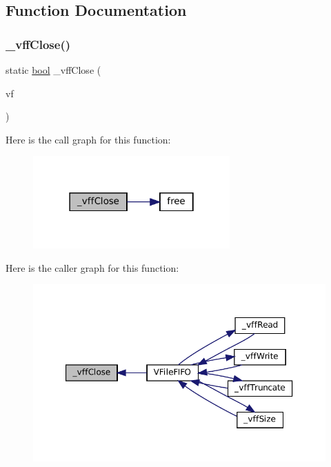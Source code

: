 \subsection{Function Documentation}
\mbox{\label{vfs-fifo_8c_ad53bab40bd3ee7acea950d7810c214d9}} 
\subsubsection{\texorpdfstring{\+\_\+vff\+Close()}{\_vffClose()}}
{\footnotesize\ttfamily static \mbox{\hyperlink{libretro_8h_a4a26dcae73fb7e1528214a068aca317e}{bool}} \+\_\+vff\+Close (\begin{DoxyParamCaption}\item[{struct V\+File $\ast$}]{vf }\end{DoxyParamCaption})\hspace{0.3cm}{\ttfamily [static]}}

Here is the call graph for this function\+:
\nopagebreak
\begin{figure}[H]
\begin{center}
\leavevmode
\includegraphics[width=214pt]{vfs-fifo_8c_ad53bab40bd3ee7acea950d7810c214d9_cgraph}
\end{center}
\end{figure}
Here is the caller graph for this function\+:
\nopagebreak
\begin{figure}[H]
\begin{center}
\leavevmode
\includegraphics[width=350pt]{vfs-fifo_8c_ad53bab40bd3ee7acea950d7810c214d9_icgraph}
\end{center}
\end{figure}
\mbox{\label{vfs-fifo_8c_ae264af80ce9f8d7e855924166bbe3866}} 
